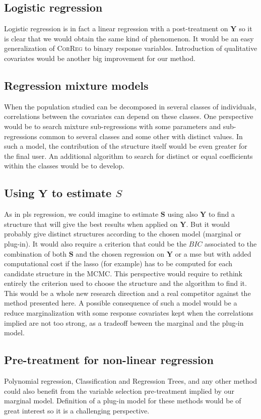 \documentclass[12pt,a4paper]{report}
\begin{document}
		\subsection{Logistic regression}
			Logistic regression \cite{hosmer2000applied} is in fact a linear regression with a post-treatment on $\boldsymbol{Y}$ so it is clear that we would obtain the same kind of phenomenon. It would be an easy generalization of \textsc{CorReg} to binary response variables. Introduction of qualitative covariates would be another big improvement for our method.
			\subsection{Regression mixture models}
			When the population studied can be decomposed in several classes of individuals, correlations between the covariates can depend on these classes. One perspective would be to search mixture sub-regressions \cite{de1989mixtures} with some parameters and sub-regressions common to several classes and some other with distinct values. In such a model, the contribution of the structure itself would be even greater for the final user. An additional algorithm to search for distinct or equal coefficients within the classes would be to develop.
			\subsection{Using $\boldsymbol{Y}$ to estimate $S$}
			As in {\sc pls} regression, we could imagine to estimate $\boldsymbol{S}$ using also $\boldsymbol{Y}$ to find a structure that will give the best results when applied on $\boldsymbol{Y}$. But it would probably give distinct structures according to the chosen model (marginal or plug-in). It would also require a criterion that could be the $BIC$ associated to the combination of both $\boldsymbol{S}$ and the chosen regression on $\boldsymbol{Y}$ or a {\sc mse}  but with added computational cost if the {\sc lasso} (for example) has to be computed for each candidate structure in the MCMC. This perspective would require to rethink entirely the criterion used to choose the structure and the algorithm to find it. This would be a whole new research direction and a real competitor against the method presented here. A possible consequence of such a model would be a reduce marginalization with some response covariates kept when the correlations implied are not too strong, as a tradeoff beween the marginal and the plug-in model.
		\subsection{Pre-treatment for non-linear regression}
			Polynomial regression, Classification and Regression Trees, and any other method could also benefit from the variable selection pre-treatment implied by our marginal model. Definition of a plug-in model for these methods would be of great interest so it is a challenging perspective.
\end{document}
